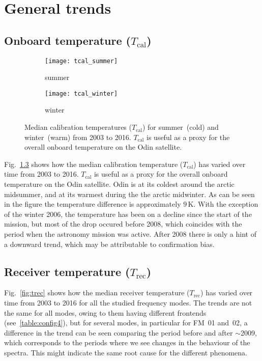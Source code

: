 \chapter{General trends}
\label{ch:general}

\section{Onboard temperature ($T_\mathrm{cal}$)}
\label{sec:Tcal}

\begin{figure}[ht]
    \centering
    \begin{subfigure}[b]{0.9545\textwidth}
        \texttt{[image: tcal\_summer]}
        \caption{summer}\label{fig:tcal:summer}
    \end{subfigure}
    \begin{subfigure}[b]{0.9545\textwidth}
        \texttt{[image: tcal\_winter]}
        \caption{winter}\label{fig:tcal:winter}
    \end{subfigure}
    \caption{Median calibration temperatures ($T_\mathrm{cal}$) for
        summer~(cold) and winter~(warm) from 2003 to 2016. $T_\mathrm{cal}$ is
        useful as a proxy for the overall onboard temperature on the Odin
        satellite.}\label{fig:tcal}
\end{figure}

\noindent
Fig.~\ref{fig:tcal} shows how the median calibration temperature
($T_\mathrm{cal}$) has varied over time from 2003 to 2016.  $T_\mathrm{cal}$ is
useful as a proxy for the overall onboard temperature on the Odin satellite.
Odin is at its coldest around the arctic midsummer, and at its warmest during
the the arctic midwinter.  As can be seen in the figure the temperature
difference is approximately $9\,\mathrm{K}$.  With the exception of the
winter 2006, the temperature has been on a decline since the start of the
mission, but most of the drop occured before 2008, which coincides with the
period when the astronomy mission was active.  After 2008 there is only a hint
of a downward trend, which may be attributable to confirmation bias.


\section{Receiver temperature ($T_\mathrm{rec}$)}
\label{sec:Trec}
Fig.~\ref{fig:trec} shows how the median receiver temperature
($T_\mathrm{rec}$) has varied over time from 2003 to 2016 for all the studied
frequency modes.  The trends are not the same for all modes, owing to them
having different frontends (see~\ref{table:config4}), but for several modes,
in particular for FM~01 and~02, a difference in the trend can be seen comparing
the period before and after $\sim$2009, which corresponds to the periods where
we see changes in the behaviour of the spectra.  This might indicate the same
root cause for the different phenomena.

